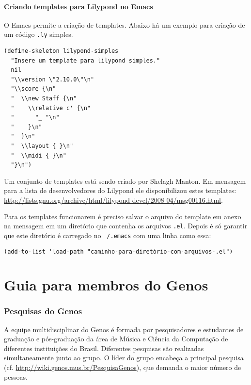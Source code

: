 \documentclass[12pt,brazil]{book}
\begin{document}
\subsection{Criando templates para Lilypond no Emacs}
\label{sec:criando-templ-para}

O Emacs permite a criação de templates. Abaixo há um exemplo para
criação de um código \texttt{.ly} simples.

\begin{verbatim}
(define-skeleton lilypond-simples
  "Insere um template para lilypond simples."
  nil
  "\\version \"2.10.0\"\n"
  "\\score {\n"
  "  \\new Staff {\n"
  "    \\relative c' {\n"
  "      "_ "\n"
  "    }\n"
  "  }\n"
  "  \\layout { }\n"
  "  \\midi { }\n"
  "}\n")
\end{verbatim}

Um conjunto de templates está sendo criado por Shelagh Manton. Em
mensagem para a lista de desenvolvedores do Lilypond ele
disponibilizou estes templates:
\url{http://lists.gnu.org/archive/html/lilypond-devel/2008-04/msg00116.html}.

Para os templates funcionarem é preciso salvar o arquivo do template
em anexo na mensagem em um diretório que contenha os arquivos
\texttt{.el}. Depois é só garantir que este diretório é carregado no
\texttt{~/.emacs} com uma linha como essa:

\begin{verbatim}
(add-to-list 'load-path "caminho-para-diretório-com-arquivos-.el")
\end{verbatim}

\part{Guia para membros do Genos}
\label{part:guia-para-membros}

\section{Pesquisas do Genos}
\label{sec:pesquisas-do-genos}

A equipe multidisciplinar do Genos é formada por pesquisadores e
estudantes de graduação e pós-graduação da área de Música e Ciência da
Computação de diferentes instituições do Brasil. Diferentes pesquisas
são realizadas simultaneamente junto ao grupo. O líder do grupo
encabeça a principal pesquisa
(cf. \url{http://wiki.genos.mus.br/PesquisaGenos}), que demanda o
maior número de pessoas.
\end{document}
